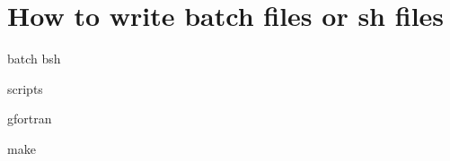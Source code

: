 
    \chapter{How to write batch files or sh files  \label{batch} }
      
      
      batch bsh 
      
      scripts 
      
      
      gfortran 
      
      make 
    
   
